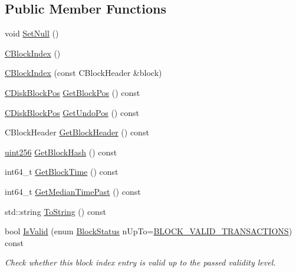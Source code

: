 \subsection*{Public Member Functions}
\begin{DoxyCompactItemize}
\item 
void \mbox{\hyperlink{class_c_block_index_a6139e9e2cfceaef3694631cb7c330ff0}{Set\+Null}} ()
\item 
\mbox{\hyperlink{class_c_block_index_a0eff34cbfb4470885020734581dc1555}{C\+Block\+Index}} ()
\item 
\mbox{\hyperlink{class_c_block_index_acaf83989071b40966072161c513a17a7}{C\+Block\+Index}} (const C\+Block\+Header \&block)
\item 
\mbox{\hyperlink{struct_c_disk_block_pos}{C\+Disk\+Block\+Pos}} \mbox{\hyperlink{class_c_block_index_ad0d95bf8524a1e94bc6cfb92adea0c63}{Get\+Block\+Pos}} () const
\item 
\mbox{\hyperlink{struct_c_disk_block_pos}{C\+Disk\+Block\+Pos}} \mbox{\hyperlink{class_c_block_index_aa06679e5dd3f2425a1b667f6804b1a94}{Get\+Undo\+Pos}} () const
\item 
C\+Block\+Header \mbox{\hyperlink{class_c_block_index_a29df6a3c3195ff87c650348a27959fa2}{Get\+Block\+Header}} () const
\item 
\mbox{\hyperlink{classuint256}{uint256}} \mbox{\hyperlink{class_c_block_index_a98490a2788c65cdd6ae9002b004dd74c}{Get\+Block\+Hash}} () const
\item 
int64\+\_\+t \mbox{\hyperlink{class_c_block_index_a9fe0d4463c07c466f66252e8eec25f5c}{Get\+Block\+Time}} () const
\item 
int64\+\_\+t \mbox{\hyperlink{class_c_block_index_aa9bd0ab02cf8b9c866618cee3a5a0583}{Get\+Median\+Time\+Past}} () const
\item 
std\+::string \mbox{\hyperlink{class_c_block_index_a18258e956a4bc77dcccdb0db8f91effe}{To\+String}} () const
\item 
bool \mbox{\hyperlink{class_c_block_index_ad8b5a6560e7c0d4222066e2922178683}{Is\+Valid}} (enum \mbox{\hyperlink{chain_8h_a0d8c285f70a59a32f4f6ab41b78f93ad}{Block\+Status}} n\+Up\+To=\mbox{\hyperlink{chain_8h_a0d8c285f70a59a32f4f6ab41b78f93ada3eef30f876594ac79b888b7d1ff6c66c}{B\+L\+O\+C\+K\+\_\+\+V\+A\+L\+I\+D\+\_\+\+T\+R\+A\+N\+S\+A\+C\+T\+I\+O\+NS}}) const
\begin{DoxyCompactList}\small\item\em Check whether this block index entry is valid up to the passed validity level. \end{DoxyCompactList}\item 

\end{DoxyCompactItemize}
